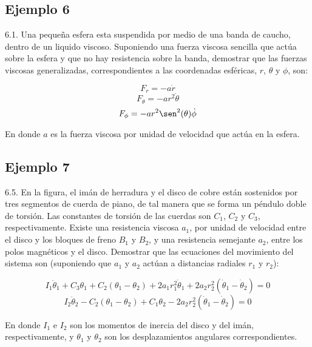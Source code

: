 \subsection{Ejemplo 6}
6.1. Una pequeña esfera esta suspendida por medio de una banda de caucho, dentro
de un liquido viscoso. Suponiendo una fuerza viscosa sencilla que actúa sobre la
esfera y que no hay resistencia sobre la banda, demostrar que las fuerzas
viscosas generalizadas, correspondientes a las coordenadas esféricas, $r$,
$\theta$ y $\phi$, son:

\begin{equation*}
    F_r=-a\dot{r}
\end{equation*}
\begin{equation*}
    F_{\theta}=-ar^2\dot{\theta}
\end{equation*}
\begin{equation*}
    F_{\phi}=-ar^2\sen^2(\theta)\dot{\phi}
\end{equation*}

En donde $a$ es la fuerza viscosa por unidad de velocidad que actúa en la
esfera.

\subsection{Ejemplo 7}
6.5. En la figura, el imán de herradura y el disco de cobre están sostenidos por
tres segmentos de cuerda de piano, de tal manera que se forma un péndulo doble
de torsión. Las constantes de torsión de las cuerdas son $C_1$, $C_2$ y $C_3$,
respectivamente. Existe una resistencia viscosa $a_1$, por unidad de velocidad
entre el disco y los bloques de freno $B_1$ y $B_2$, y una resistencia semejante
$a_2$, entre los polos magnéticos y el disco. Demostrar que las ecuaciones del
movimiento del sistema son (suponiendo que $a_1$ y $a_2$ actúan a distancias
radiales $r_1$ y $r_2$):

\begin{equation*}
    I_1\ddot{\theta}_1+
    C_3\theta_1+
    C_2(\theta_1-\theta_2)+
    2a_1r_1^2\dot{\theta}_1+
    2a_2r_2^2(\dot{\theta}_1-\dot{\theta}_2)=0
\end{equation*}
\begin{equation*}
    I_2\ddot{\theta}_2-
    C_2(\theta_1-\theta_2)+
    C_1\theta_2-
    2a_2r_2^2(\dot{\theta}_1-\dot{\theta}_2)=0
\end{equation*}

En donde $I_1$ e $I_2$ son los momentos de inercia del disco y del imán,
respectivamente, y $\theta_1$ y $\theta_2$ son los desplazamientos angulares
correspondientes.

